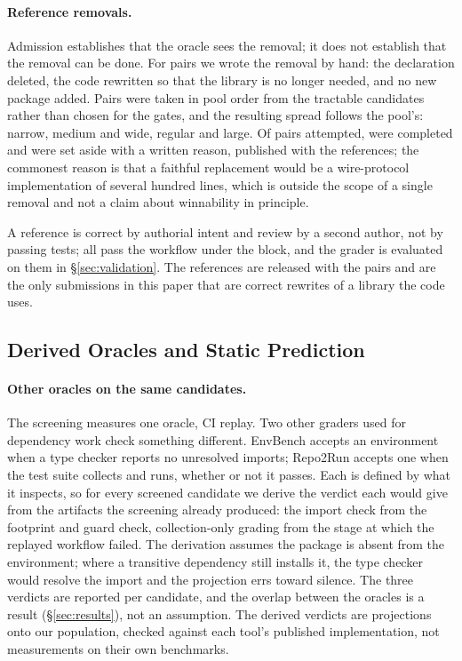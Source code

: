 \documentclass[11pt]{article}
\newif\ifdraft
\newcommand{\todo}[1]{\ifdraft\textcolor{red}{\textbf{[TODO: #1]}}\fi}
\begin{document}
\paragraph{Reference removals.}
Admission establishes that the oracle sees the removal; it does not establish that the removal can be done.
For \nRefs{} pairs we wrote the removal by hand: the declaration deleted, the code rewritten so that the library is no longer needed, and no new package added.
Pairs were taken in pool order from the tractable candidates rather than chosen for the gates, and the resulting spread follows the pool's: \nRefsStrong{} narrow, \nRefsMedium{} medium and \nRefsHard{} wide, \nRefsRegular{} regular and \nRefsLarge{} large.
Of \nRefsAttempted{} pairs attempted, \nRefs{} were completed and \nRefsAbandoned{} were set aside with a written reason, published with the references; the commonest reason is that a faithful replacement would be a wire-protocol implementation of several hundred lines, which is outside the scope of a single removal and not a claim about winnability in principle.
\todo{Confirm for the camera-ready who wrote each reference and whether any author consulted the gate implementations while writing it; the honest answer shapes how \S\ref{sec:validation} may be read.}
A reference is correct by authorial intent and review by a second author, not by passing tests; all \nRefs{} pass the workflow under the block, and the grader is evaluated on them in \S\ref{sec:validation}.
The references are released with the pairs and are the only submissions in this paper that are correct rewrites of a library the code uses.

\subsection{Derived Oracles and Static Prediction}
\label{sec:derived}

\paragraph{Other oracles on the same candidates.}
The screening measures one oracle, CI replay.
Two other graders used for dependency work check something different.
EnvBench accepts an environment when a type checker reports no unresolved imports; Repo2Run accepts one when the test suite collects and runs, whether or not it passes.
Each is defined by what it inspects, so for every screened candidate we derive the verdict each would give from the artifacts the screening already produced: the import check from the footprint and guard check, collection-only grading from the stage at which the replayed workflow failed.
The derivation assumes the package is absent from the environment; where a transitive dependency still installs it, the type checker would resolve the import and the projection errs toward silence.
The three verdicts are reported per candidate, and the overlap between the oracles is a result (\S\ref{sec:results}), not an assumption.
The derived verdicts are projections onto our population, checked against each tool's published implementation, not measurements on their own benchmarks.
\end{document}
